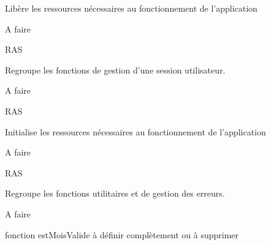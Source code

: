 Libère les ressources nécessaires au fonctionnement de l'application

\begin{DoxyRefDesc}{A faire}
\item[\hyperlink{todo__todo000007}{A faire}]R\-A\-S \end{DoxyRefDesc}


Regroupe les fonctions de gestion d'une session utilisateur.

\begin{DoxyRefDesc}{A faire}
\item[\hyperlink{todo__todo000008}{A faire}]R\-A\-S \end{DoxyRefDesc}


Initialise les ressources nécessaires au fonctionnement de l'application

\begin{DoxyRefDesc}{A faire}
\item[\hyperlink{todo__todo000009}{A faire}]R\-A\-S \end{DoxyRefDesc}


Regroupe les fonctions utilitaires et de gestion des erreurs.

\begin{DoxyRefDesc}{A faire}
\item[\hyperlink{todo__todo000011}{A faire}]fonction est\-Mois\-Valide à définir complètement ou à supprimer \end{DoxyRefDesc}
